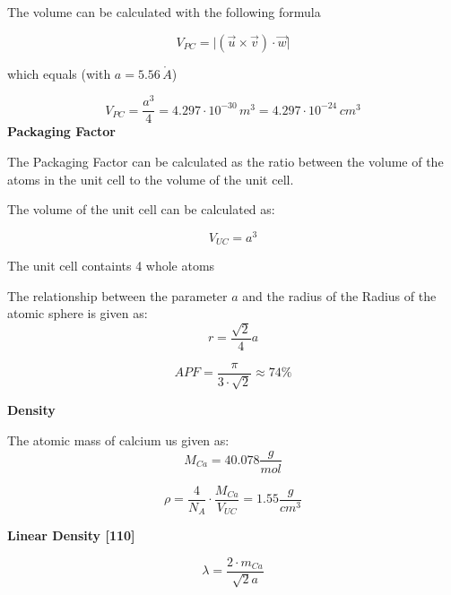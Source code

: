 The volume can be calculated with the following formula

$$V_{PC} = \vert (\vec{u} \times \vec{v})  \cdot \vec{w} \vert$$

which equals (with $a = 5.56 \, \mathring{A}$)

$$V_{PC} = \frac{a^3}{4} = 4.297 \cdot 10^{-30} \,m^3 = 4.297 \cdot 10^{-24} \,cm^3$$
\textbf{Packaging Factor}

The Packaging Factor can be calculated as the ratio between the
volume of the atoms in the unit cell to the volume of the unit cell.

The volume of the unit cell can be calculated as:

$$V_{UC} = a^3$$


The unit cell containts 4 whole atoms 

The relationship between the parameter $a$ and the radius of the Radius of the atomic sphere is given as:
$$r = \frac{\sqrt{2}}{4} a $$

$$APF = \frac{\pi}{3 \cdot \sqrt{2}} \approx 74\%$$


\textbf{Density}

The atomic mass of calcium us given as:
$$M_{Ca} = 40.078 \frac{g}{mol}$$



$$\rho = \frac{4}{N_A} \cdot \frac{M_{Ca}}{V_{UC}} = 1.55 \frac{g}{cm^3}$$

\textbf{Linear Density [110]}

$$\lambda = \frac{2 \cdot m_{Ca}}{\sqrt{2}a}$$
